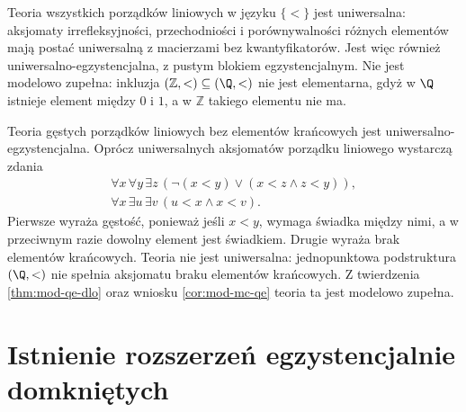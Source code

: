 \begin{przyklad}
\label{ex:mod-mc-inductive-not-mc}
Teoria wszystkich porządków liniowych w języku $\{<\}$
jest uniwersalna: aksjomaty irrefleksyjności,
przechodniości i porównywalności różnych elementów
mają postać uniwersalną z macierzami bez kwantyfikatorów.
Jest więc również uniwersalno-egzystencjalna,
z pustym blokiem egzystencjalnym.
Nie jest modelowo zupełna: inkluzja
$(\mathbb Z,<)\subseteq(\Q,<)$ nie jest elementarna,
gdyż w $\Q$ istnieje element między $0$ i $1$,
a w $\mathbb Z$ takiego elementu nie ma.
\end{przyklad}

\begin{przyklad}
\label{ex:mod-mc-inductive-not-universal}
Teoria gęstych porządków liniowych bez elementów
krańcowych jest uniwersalno-egzystencjalna. Oprócz
uniwersalnych aksjomatów porządku liniowego wystarczą
zdania
\[
\begin{gathered}
\forall x\,\forall y\,\exists z\,
(\neg(x<y)\lor(x<z\land z<y)),\\
\forall x\,\exists u\,\exists v\,(u<x\land x<v).
\end{gathered}
\]
Pierwsze wyraża gęstość, ponieważ jeśli $x<y$,
wymaga świadka między nimi, a w przeciwnym razie
dowolny element jest świadkiem. Drugie wyraża brak
elementów krańcowych. Teoria nie jest uniwersalna:
jednopunktowa podstruktura $(\Q,<)$ nie spełnia
aksjomatu braku elementów krańcowych.
Z twierdzenia \ref{thm:mod-qe-dlo} oraz wniosku
\ref{cor:mod-mc-qe} teoria ta jest modelowo zupełna.
\end{przyklad}

\section{Istnienie rozszerzeń egzystencjalnie domkniętych}

